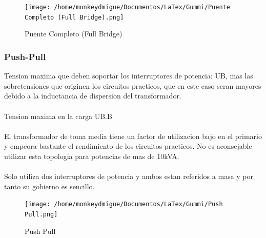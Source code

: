 \documentclass[11pt]{article}
\begin{document}
\begin{figure}[htp]
\centering 

\texttt{[image: /home/monkeydmigue/Documentos/LaTex/Gummi/Puente Completo (Full Bridge).png]}
\caption{Puente Completo (Full Bridge)}
\label{}
\end{figure}



\pagebreak

\subsubsection{Push-Pull}
Tension maxima que deben soportar los interruptores de potencia: UB, mas las sobretensiones que originen los   circuitos practicos, que en este caso seran mayores debido a la inductancia de dispersion del transformador.\\\\Tension maxima en la carga UB.B\\\\El transformador de toma media tiene un factor de utilizacion bajo en el primario y empeora bastante el rendimiento de los circuitos practicos. No es aconsejable utilizar esta topologia para potencias de mas de 10kVA.\\\\Solo utiliza dos interruptores de potencia y ambos estan referidos a masa y por tanto su gobierno es sencillo.
\begin{figure}[htp]
\centering
\texttt{[image: /home/monkeydmigue/Documentos/LaTex/Gummi/Push Pull.png]}
\caption{Push Pull}
\label{}
\end{figure}
\pagebreak
\end{document}
